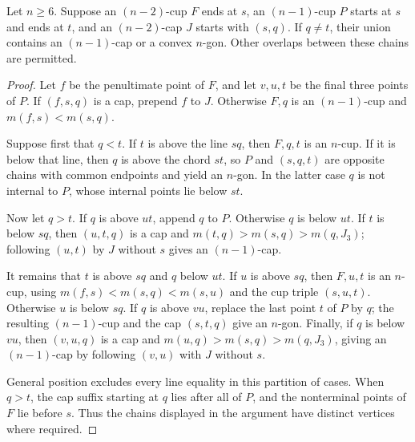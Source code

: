 \begin{lemma}\label{lem:threechain}
Let $n\ge6$. Suppose an $(n-2)$-cup $F$ ends at $s$, an $(n-1)$-cup
$P$ starts at $s$ and ends at $t$, and an $(n-2)$-cap $J$ starts with
$(s,q)$. If $q\ne t$, their union contains an $(n-1)$-cap or a convex
$n$-gon. Other overlaps between these chains are permitted.
\end{lemma}
\begin{proof}
Let $f$ be the penultimate point of $F$, and let $v,u,t$ be the final
three points of $P$. If $(f,s,q)$ is a cap, prepend $f$ to $J$.
Otherwise $F,q$ is an $(n-1)$-cup and $m(f,s)<m(s,q)$.

Suppose first that $q<t$. If $t$ is above the line $sq$, then $F,q,t$
is an $n$-cup. If it is below that line, then $q$ is above the chord
$st$, so $P$ and $(s,q,t)$ are opposite chains with common endpoints
and yield an $n$-gon. In the latter case $q$ is not internal to $P$,
whose internal points lie below $st$.

Now let $q>t$. If $q$ is above $ut$, append $q$ to $P$. Otherwise
$q$ is below $ut$. If $t$ is below $sq$, then $(u,t,q)$ is a cap and
$m(t,q)>m(s,q)>m(q,J_3)$; following $(u,t)$ by $J$ without $s$
gives an $(n-1)$-cap.

It remains that $t$ is above $sq$ and $q$ below $ut$. If $u$ is above
$sq$, then $F,u,t$ is an $n$-cup, using
$m(f,s)<m(s,q)<m(s,u)$ and the cup triple $(s,u,t)$. Otherwise
$u$ is below $sq$. If $q$ is above $vu$, replace the last point $t$
of $P$ by $q$; the resulting $(n-1)$-cup and the cap $(s,t,q)$
give an $n$-gon. Finally, if $q$ is below $vu$, then $(v,u,q)$ is a
cap and $m(u,q)>m(s,q)>m(q,J_3)$, giving an $(n-1)$-cap by following
$(v,u)$ with $J$ without $s$.

General position excludes every line equality in this partition of
cases. When $q>t$, the cap suffix starting at $q$ lies after all of
$P$, and the nonterminal points of $F$ lie before $s$. Thus the chains
displayed in the argument have distinct vertices where required.
\end{proof}

